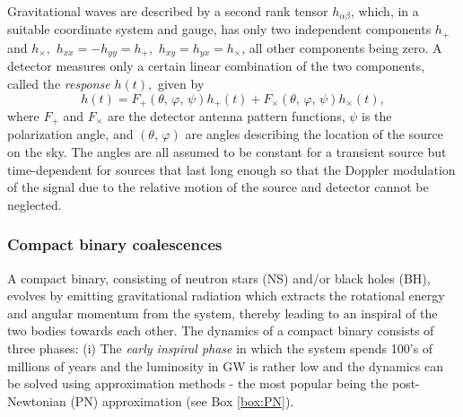 {Gravitational waves are described by a second rank tensor 
$h_{\alpha\beta}$, which, in a suitable coordinate system and gauge,
has only two independent components $h_+$ and $h_\times,$ $h_{xx}=-h_{yy}=h_+,$
$h_{xy} = h_{yx} = h_\times$, all other components being zero.
A detector measures only a certain linear combination of the
two components, called the {\em response} $h(t),$ given by
\begin{equation}
h(t) = F_+(\theta,\, \varphi,\, \psi) h_+(t) +
       F_\times(\theta,\, \varphi,\, \psi) h_\times(t),
\label{eq:response}
\end{equation}
where $F_+$ and $F_\times$ are the detector antenna pattern functions,
$\psi$ is the polarization angle, and $(\theta,\,\varphi)$ are angles
describing the location of the source on the sky. The angles are
all assumed to be constant for a transient source but time-dependent 
for sources that last long enough so that the Doppler modulation 
of the signal due to the relative motion of the source and detector
cannot be neglected. 
}
\FloatBarrier
\subsubsection{Compact binary coalescences}

A compact binary, consisting of neutron stars (NS) and/or black holes (BH),
evolves by emitting gravitational radiation which extracts the rotational 
energy and angular momentum from the system, thereby leading to an inspiral 
of the two bodies towards each other.  The dynamics of a compact binary consists
of three phases: (i) The {\it early inspiral phase} in which the
system spends 100's of millions of years and the luminosity
in GW is rather low and the dynamics can be solved using approximation
methods - the most popular being the post-Newtonian (PN) approximation
(see Box \ref{box:PN}). 

